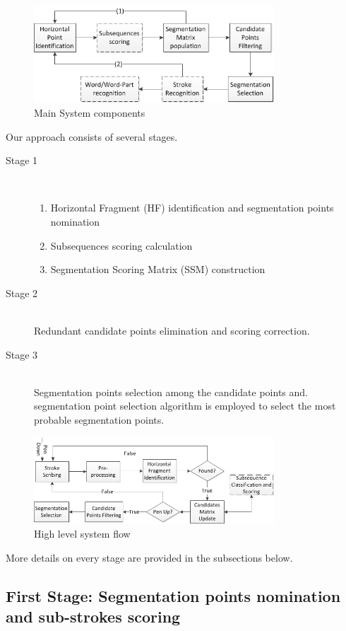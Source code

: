 \documentclass[journal,compsoc]{IEEEtran}
\begin{document}
\begin{figure}
\centering
\includegraphics[width=9cm]{./figures/main_system_components}
\caption{Main System components}
\label{fig:main_system_components}
\end{figure}

Our approach consists of several stages. 
\begin{description}
  \item[Stage 1] \hfill \\
  \begin{enumerate}
  \item Horizontal Fragment (HF) identification and segmentation points nomination
  \item Subsequences scoring calculation
  \item Segmentation Scoring Matrix (SSM) construction
  \end{enumerate}
  \item[Stage 2] \hfill \\
  Redundant candidate points elimination and scoring correction.
  \item[Stage 3] \hfill \\
  Segmentation points selection among the candidate points and. segmentation point selection algorithm is employed to select the most probable segmentation points.
\end{description}

\begin{figure}
\centering
\includegraphics[width=9cm]{./figures/system_flow}
\caption{High level system flow}
\label{fig:system_flow}
\end{figure}

More details on every stage are provided in the subsections below.

\subsection{First Stage: Segmentation points nomination and sub-strokes scoring}
\end{document}
